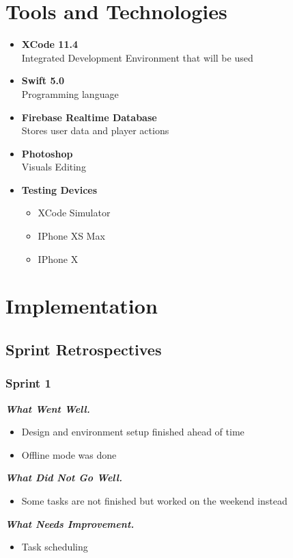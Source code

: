 \documentclass{article}
\begin{document}
\section{Tools and Technologies}
    \begin{itemize}
        \item \textbf{XCode 11.4}\\Integrated Development Environment that will be used
        \item \textbf{Swift 5.0}\\Programming language
        \item \textbf{Firebase Realtime Database}\\Stores user data and player actions
        \item \textbf{Photoshop}\\Visuals Editing
        
        \item \textbf{Testing Devices}
            \begin{itemize}
            \item XCode Simulator
            \item IPhone XS Max
            \item IPhone X
            \end{itemize}
    \end{itemize}
\newpage
\section{Implementation}
\subsection{Sprint Retrospectives}
    \subsubsection{Sprint 1}
        \textbf{\emph{What Went Well.}}
        \begin{itemize}
            \item Design and environment setup finished ahead of time
            \item Offline mode was done
        \end{itemize}
        \textbf{\emph{What Did Not Go Well.}}
        \begin{itemize}
            \item Some tasks are not finished but worked on the weekend instead
        \end{itemize}
        \textbf{\emph{What Needs Improvement.}}
            \begin{itemize}
                \item Task scheduling
            \end{itemize}
\end{document}
